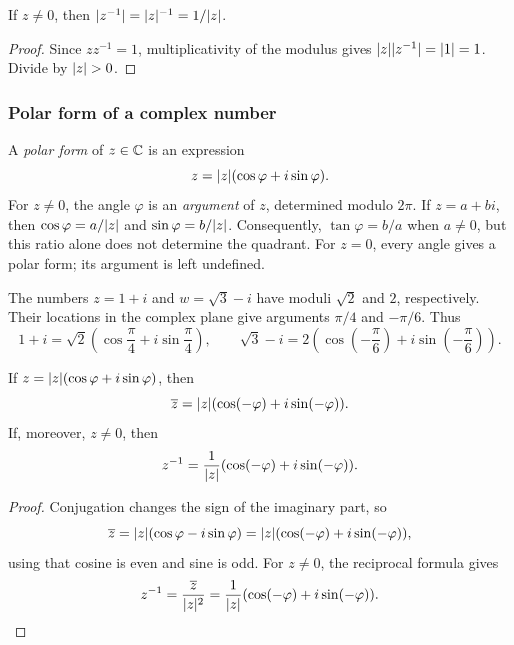 \documentclass[11pt,a4paper]{amsart}
\begin{document}
\begin{proposition}
  If \(z\neq0\), then \(\lvert z^{-1}\rvert=\lvert z\rvert^{-1}=1/\lvert z\rvert\).
\end{proposition}

\begin{proof}
  Since \(zz^{-1}=1\), multiplicativity of the modulus gives
  \(\lvert z\rvert\lvert z^{-1}\rvert=\lvert1\rvert=1\). Divide by \(\lvert z\rvert>0\).
\end{proof}

\subsubsection{Polar form of a complex number}

\begin{definition}
  A \emph{polar form} of \(z\in\mathbb{C}\) is an expression
  \[
    z=\lvert z\rvert(\cos\varphi+i\sin\varphi).
  \]
  For \(z\neq0\), the angle \(\varphi\) is an \emph{argument} of
  \(z\), determined modulo \(2\pi\). If \(z=a+bi\), then
  \(\cos\varphi=a/\lvert z\rvert\) and \(\sin\varphi=b/\lvert z\rvert\).
  Consequently, \(\tan\varphi=b/a\) when \(a\neq0\), but this
  ratio alone does not determine the quadrant. For \(z=0\), every
  angle gives a polar form; its argument is left undefined.
\end{definition}

\begin{example}
  The numbers \(z=1+i\) and \(w=\sqrt3-i\) have moduli
  \(\sqrt2\) and \(2\), respectively. Their locations in the
  complex plane give arguments \(\pi/4\) and \(-\pi/6\). Thus
  \[
    1+i=\sqrt2\left(\cos\frac\pi4+i\sin\frac\pi4\right),
    \qquad
    \sqrt3-i=2\left(\cos\!\left(-\frac\pi6\right)
    +i\sin\!\left(-\frac\pi6\right)\right).
  \]
\end{example}

\begin{proposition}
  If \(z=\lvert z\rvert(\cos\varphi+i\sin\varphi)\), then
  \[
    \overline z=\lvert z\rvert(\cos(-\varphi)+i\sin(-\varphi)).
  \]
  If, moreover, \(z\neq0\), then
  \[
    z^{-1}=\frac1{\lvert z\rvert}
    (\cos(-\varphi)+i\sin(-\varphi)).
  \]
\end{proposition}

\begin{proof}
  Conjugation changes the sign of the imaginary part, so
  \[
    \overline z=\lvert z\rvert(\cos\varphi-i\sin\varphi)
    =\lvert z\rvert(\cos(-\varphi)+i\sin(-\varphi)),
  \]
  using that cosine is even and sine is odd. For \(z\neq0\),
  the reciprocal formula gives
  \[
    z^{-1}=\frac{\overline z}{\lvert z\rvert^{2}}
    =\frac1{\lvert z\rvert}
    (\cos(-\varphi)+i\sin(-\varphi)).
  \]
\end{proof}
\end{document}
